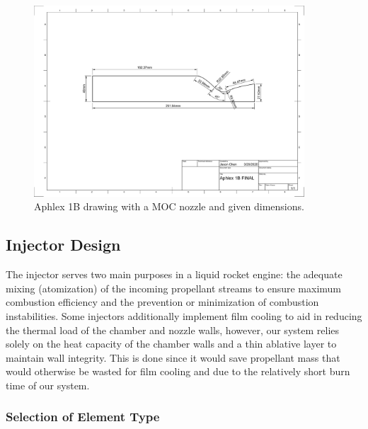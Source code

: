 \documentclass[9pt]{article} %
\numberwithin{equation}{section} %
\begin{document}
\begin{figure}
\centering
\includegraphics[scale=0.5, width=0.9\textwidth, trim={7.25cm 12.5cm 5.5cm 9cm}, clip]{aphlex1b-drawing-2} %
\caption{Aphlex 1B drawing with a MOC nozzle and given dimensions.}
\label{fig:moc_nozzle_drawing}
\end{figure}

\subsection{Injector Design}

\hspace{\parindent} The injector serves two main purposes in a liquid rocket engine: the adequate mixing (atomization) of the incoming propellant streams to ensure maximum combustion efficiency and the prevention or minimization of combustion instabilities. Some injectors additionally implement film cooling to aid in reducing the thermal load of the chamber and nozzle walls, however, our system relies solely on the heat capacity of the chamber walls and a thin ablative layer to maintain wall integrity. This is done since it would save propellant mass that would otherwise be wasted for film cooling and due to the relatively short burn time of our system. 

\subsubsection{Selection of Element Type}
\end{document}
